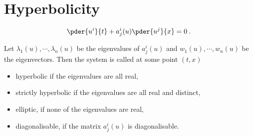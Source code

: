 \section{Hyperbolicity}

\begin{definition}
    \begin{align}
        \pder{u^i}{t} + a^i_j(u) \pder{u^j}{x} = 0 \:.
    \end{align}
\end{definition}

Let $\lambda_1(u), \cdots, \lambda_n(u)$ be the eigenvalues of $a^i_j(u)$ and $w_1(u), \cdots, w_n(u)$ be the eigenvectors. Then the system is called at some point $(t,x)$
\begin{itemize}
    \item hyperbolic if the eigenvalues are all real,
    \item strictly hyperbolic if the eigenvalues are all real and distinct,
    \item elliptic, if none of the eigenvalues are real,
    \item diagonalisable, if the matrix $a^i_j(u)$ is diagonalisable.
\end{itemize}
